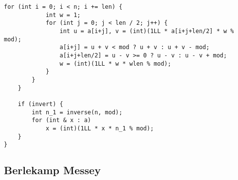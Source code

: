 \documentclass[10pt]{article}
\begin{document}
\begin{multicols*}{2}
\begin{lstlisting}[style=compactcpp]
        for (int i = 0; i < n; i += len) {
            int w = 1;
            for (int j = 0; j < len / 2; j++) {
                int u = a[i+j], v = (int)(1LL * a[i+j+len/2] * w % mod);
                a[i+j] = u + v < mod ? u + v : u + v - mod;
                a[i+j+len/2] = u - v >= 0 ? u - v : u - v + mod;
                w = (int)(1LL * w * wlen % mod);
            }
        }
    }

    if (invert) {
        int n_1 = inverse(n, mod);
        for (int & x : a)
            x = (int)(1LL * x * n_1 % mod);
    }
}
\end{lstlisting}

\subsection{Berlekamp Messey}


\end{multicols*}
\end{document}
